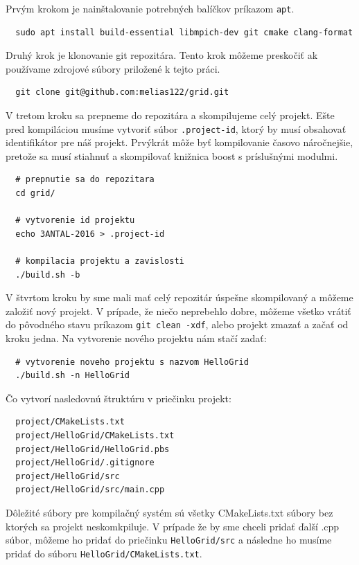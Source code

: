 Prvým krokom je nainštalovanie potrebných balíčkov príkazom \texttt{apt}.
\begin{lstlisting}
  sudo apt install build-essential libmpich-dev git cmake clang-format
\end{lstlisting}
Druhý krok je klonovanie git repozitára. Tento krok môžeme preskočiť ak používame zdrojové súbory priložené k tejto práci.
\begin{lstlisting}
  git clone git@github.com:melias122/grid.git
\end{lstlisting}
V tretom kroku sa prepneme do repozitára a skompilujeme celý projekt.
Ešte pred kompiláciou musíme vytvoriť súbor \texttt{.project-id}, ktorý by musí obsahovať
identifikátor pre náš projekt.
Prvýkrát môže byť kompilovanie časovo náročnejšie,
pretože sa musí stiahnuť a skompilovať knižnica boost s príslušnými modulmi. 
\begin{lstlisting}
  # prepnutie sa do repozitara
  cd grid/

  # vytvorenie id projektu
  echo 3ANTAL-2016 > .project-id

  # kompilacia projektu a zavislosti
  ./build.sh -b
\end{lstlisting}
V štvrtom kroku by sme mali mať celý repozitár úspešne skompilovaný a môžeme založiť nový projekt.
V prípade, že niečo neprebehlo dobre, môžeme všetko vrátiť do pôvodného stavu príkazom \texttt{git clean -xdf}, alebo projekt zmazať a začať od kroku jedna.
Na vytvorenie nového projektu nám stačí zadať:
\begin{lstlisting}
  # vytvorenie noveho projektu s nazvom HelloGrid
  ./build.sh -n HelloGrid
\end{lstlisting}
Čo vytvorí nasledovnú štruktúru v priečinku projekt:
\begin{lstlisting}
  project/CMakeLists.txt
  project/HelloGrid/CMakeLists.txt
  project/HelloGrid/HelloGrid.pbs
  project/HelloGrid/.gitignore
  project/HelloGrid/src
  project/HelloGrid/src/main.cpp
\end{lstlisting}
Dôležité súbory pre kompilačný systém sú všetky CMakeLists.txt súbory bez ktorých sa projekt neskomkpiluje.
V prípade že by sme chceli pridať ďalší .cpp súbor, môžeme ho pridať do priečinku \texttt{HelloGrid/src} a následne ho musíme pridať do
súboru \texttt{HelloGrid/CMakeLists.txt}.

